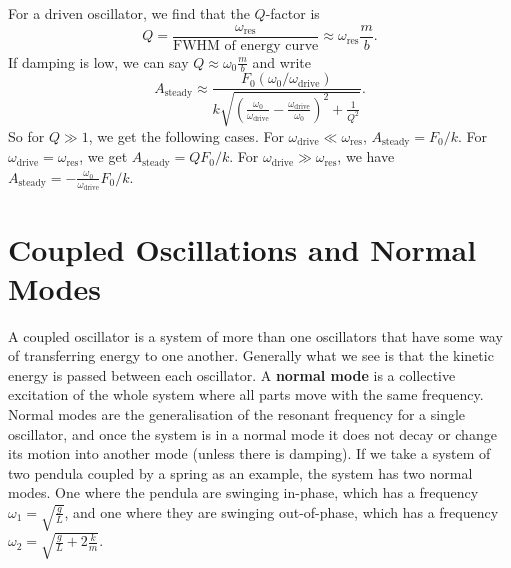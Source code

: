 \documentclass[../classical_mechanics.tex]{subfiles}
\begin{document}
            For a driven oscillator, we find that the $Q$-factor is
            \begin{equation}
                Q=\frac{\omega_\text{res}}{\text{FWHM of energy curve}}\approx\omega_\text{res}\frac{m}{b}.
            \end{equation}
            If damping is low, we can say $Q\approx\omega_0\frac{m}{b}$ and write
            \begin{equation}
                A_\text{steady}\approx\frac{F_0(\omega_0/\omega_\text{drive})}{k\sqrt{\left(\frac{\omega_0}{\omega_\text{drive}}-\frac{\omega_\text{drive}}{\omega_0}\right)^2+\frac{1}{Q^2}}}.
            \end{equation}
            So for $Q\gg 1$, we get the following cases.
            For $\omega_\text{drive}\ll\omega_\text{res}$, $A_\text{steady}=F_0/k$.
            For $\omega_\text{drive}=\omega_\text{res}$, we get $A_\text{steady}=QF_0/k$.
            For $\omega_\text{drive}\gg\omega_\text{res}$, we have $A_\text{steady}=-\frac{\omega_0}{\omega_\text{drive}}F_0/k$.

    \section{Coupled Oscillations and Normal Modes}\label{sec:coupled-oscillations-and-normal-modes}
        A coupled oscillator is a system of more than one oscillators that have some way of transferring energy to one another.
        Generally what we see is that the kinetic energy is passed between each oscillator.
        A \textbf{normal mode} is a collective excitation of the whole system where all parts move with the same frequency.
        Normal modes are the generalisation of the resonant frequency for a single oscillator, and once the system is in a normal mode it does not decay or change its motion into another mode (unless there is damping).
        If we take a system of two pendula coupled by a spring as an example, the system has two normal modes.
        One where the pendula are swinging in-phase, which has a frequency $\omega_1=\sqrt{\frac{g}{L}}$, and one where they are swinging out-of-phase, which has a frequency $\omega_2=\sqrt{\frac{g}{L}+2\frac{k}{m}}$.
\end{document}
